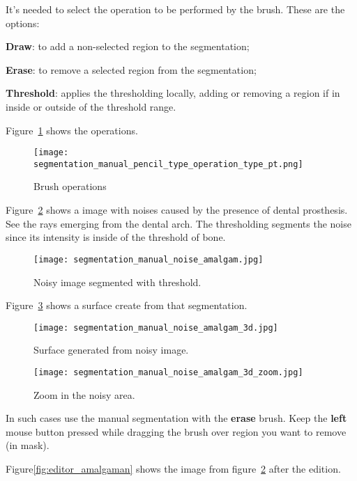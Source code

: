 It's needed to select the operation to be performed by the brush. These are the options:

\textbf{Draw}: to add a non-selected region to the segmentation;

\textbf{Erase}: to remove a selected region from the segmentation;

\textbf{Threshold}: applies the thresholding locally, adding or removing a
region if in inside or outside of the threshold range.

Figure~\ref{fig:select_brush_operations} shows the operations.

\begin{figure}[!htb]
\centering
\texttt{[image: segmentation\_manual\_pencil\_type\_operation\_type\_pt.png]}
\caption{Brush operations}
\label{fig:select_brush_operations}
\end{figure}

Figure~\ref{fig:noise_amalgaman} shows a image with noises caused by the presence of dental prosthesis. See the rays emerging from the dental arch. The thresholding segments the noise since its intensity is inside of the threshold of bone.

\begin{figure}[!htb]
\centering
\texttt{[image: segmentation\_manual\_noise\_amalgam.jpg]}
\caption{Noisy image segmented with threshold.}
\label{fig:noise_amalgaman}
\end{figure}

Figure~\ref{fig:surface_amagaman} shows a surface create from that segmentation.

\begin{figure}[!htb]
\centering
\texttt{[image: segmentation\_manual\_noise\_amalgam\_3d.jpg]}
\caption{Surface generated from noisy image.}
\label{fig:surface_amagaman}
\end{figure}

\begin{figure}[!htb]
\centering
\texttt{[image: segmentation\_manual\_noise\_amalgam\_3d\_zoom.jpg]}
\caption{Zoom in the noisy area.}
\label{fig:surface_amagaman_zoom}
\end{figure}

In such cases use the manual segmentation with the \textbf{erase} brush. Keep the \textbf{left} mouse button pressed while dragging the brush over region you want to remove (in mask).

Figure\ref{fig:editor_amalgaman} shows the image from figure~\ref{fig:noise_amalgaman} after the edition.

